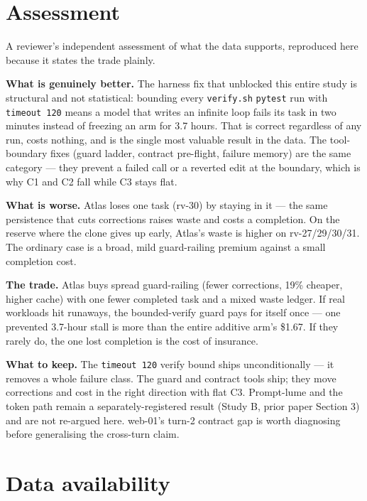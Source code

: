 \documentclass[11pt]{article}
\begin{document}
\section{Assessment}
\label{sec:assessment}

A reviewer's independent assessment of what the data supports, reproduced here because it states the trade plainly.

\textbf{What is genuinely better.} The harness fix that unblocked this entire study is structural and not statistical: bounding every \texttt{verify.sh} \texttt{pytest} run with \texttt{timeout 120} means a model that writes an infinite loop fails its task in two minutes instead of freezing an arm for 3.7 hours. That is correct regardless of any run, costs nothing, and is the single most valuable result in the data. The tool-boundary fixes (guard ladder, contract pre-flight, failure memory) are the same category --- they prevent a failed call or a reverted edit at the boundary, which is why C1 and C2 fall while C3 stays flat.

\textbf{What is worse.} Atlas loses one task (rv-30) by staying in it --- the same persistence that cuts corrections raises waste and costs a completion. On the reserve where the clone gives up early, Atlas's waste is higher on rv-27/29/30/31. The ordinary case is a broad, mild guard-railing premium against a small completion cost.

\textbf{The trade.} Atlas buys spread guard-railing (fewer corrections, 19\% cheaper, higher cache) with one fewer completed task and a mixed waste ledger. If real workloads hit runaways, the bounded-verify guard pays for itself once --- one prevented 3.7-hour stall is more than the entire additive arm's \$1.67. If they rarely do, the one lost completion is the cost of insurance.

\textbf{What to keep.} The \texttt{timeout 120} verify bound ships unconditionally --- it removes a whole failure class. The guard and contract tools ship; they move corrections and cost in the right direction with flat C3. Prompt-lume and the token path remain a separately-registered result (Study B, prior paper Section 3) and are not re-argued here. web-01's turn-2 contract gap is worth diagnosing before generalising the cross-turn claim.

\section{Data availability}
\label{sec:data}
\end{document}
